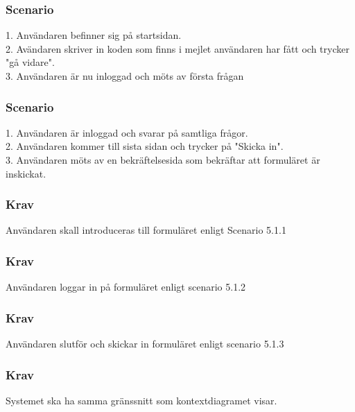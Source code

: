 \documentclass{article}
\begin{document}
    \subsubsection{Scenario}
    1. Användaren befinner sig på startsidan. \\
    2. Avändaren skriver in koden som finns i mejlet användaren har fått och trycker "gå vidare". \\
    3. Användaren är nu inloggad och möts av första frågan\\
    
    \subsubsection{Scenario}
    1. Användaren är inloggad och svarar på samtliga frågor. \\
    2. Användaren kommer till sista sidan och trycker på "Skicka in". \\
    3. Användaren möts av en bekräftelsesida som bekräftar att formuläret är inskickat.
    
    
    \subsubsection{Krav}
    Användaren skall introduceras till formuläret enligt Scenario 5.1.1
    
    \subsubsection{Krav}
    Användaren loggar in på formuläret enligt scenario 5.1.2
    
    \subsubsection{Krav}
    Användaren slutför och skickar in formuläret enligt scenario 5.1.3
    
    \subsubsection{Krav}
    Systemet ska ha samma gränssnitt som kontextdiagramet visar.
    
\end{document}
